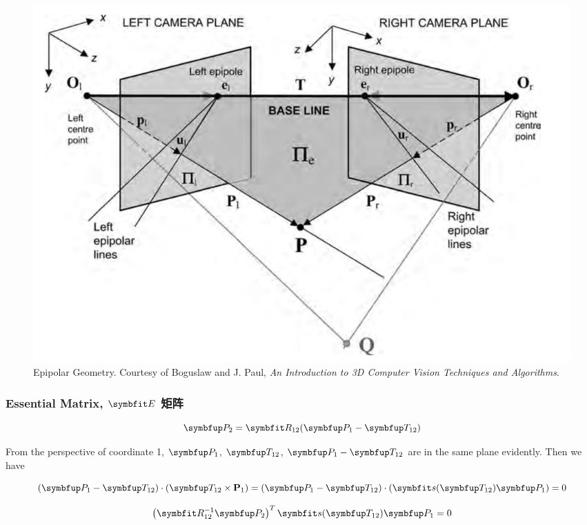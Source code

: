 \begin{figure}[htbp]

\centering

\includegraphics[width=0.7\linewidth]{figure/epipolar_geometry.png}

\caption{Epipolar Geometry. Courtesy of Boguslaw and J. Paul, \textit{An Introduction to 3D Computer Vision Techniques and Algorithms}.}

\end{figure}

\subsubsection{Essential Matrix, $\Matr{E}$ 矩阵}
$$\Vect{P}_2=\Matr{R}_{12}(\Vect{P}_1-\Vect{T}_{12})$$

From the perspective of coordinate 1, $\Vect{P}_1$, $\Vect{T}_{12}$, $\Vect{P}_1-\Vect{T}_{12}$ are in the same plane evidently.
Then we have 

\begin{equation}
\left(\Vect{P}_{1}-\Vect{T}_{12}\right) \cdot\left(\Vect{T}_{12} \times \mathbf{P}_{1}\right)=\left(\Vect{P}_{1}-\Vect{T}_{12}\right) \cdot\left(\Matr{s}(\Vect{T}_{12})  \Vect{P}_{1}\right)=0
\end{equation}

\begin{equation}
\left(\Matr{R}_{12}^{-1} \Vect{P}_{2}\right)^{T} \Matr{s}(\Vect{T}_{12}) \Vect{P}_{1}=0
\end{equation}



